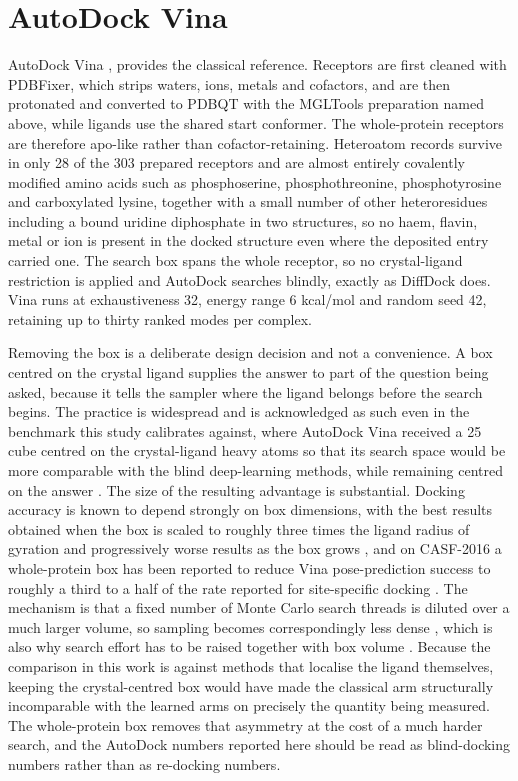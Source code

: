 \hypertarget{autodock-vina-2}{%
\section{AutoDock Vina}\label{autodock-vina-2}}

AutoDock Vina \cite{ref022}, \cite{ref023} provides the classical reference. Receptors are first cleaned with PDBFixer, which strips waters, ions, metals and cofactors, and are then protonated and converted to PDBQT with the MGLTools preparation named above, while ligands use the shared start conformer. The whole-protein receptors are therefore apo-like rather than cofactor-retaining. Heteroatom records survive in only 28 of the 303 prepared receptors and are almost entirely covalently modified amino acids such as phosphoserine, phosphothreonine, phosphotyrosine and carboxylated lysine, together with a small number of other heteroresidues including a bound uridine diphosphate in two structures, so no haem, flavin, metal or ion is present in the docked structure even where the deposited entry carried one. The search box spans the whole receptor, so no crystal-ligand restriction is applied and AutoDock searches blindly, exactly as DiffDock does. Vina runs at exhaustiveness 32, energy range 6 kcal/mol and random seed 42, retaining up to thirty ranked modes per complex.

Removing the box is a deliberate design decision and not a convenience. A box centred on the crystal ligand supplies the answer to part of the question being asked, because it tells the sampler where the ligand belongs before the search begins. The practice is widespread and is acknowledged as such even in the benchmark this study calibrates against, where AutoDock Vina received a 25 \angstrom{} cube centred on the crystal-ligand heavy atoms so that its search space would be more comparable with the blind deep-learning methods, while remaining centred on the answer \cite{ref035}. The size of the resulting advantage is substantial. Docking accuracy is known to depend strongly on box dimensions, with the best results obtained when the box is scaled to roughly three times the ligand radius of gyration and progressively worse results as the box grows \cite{ref079}, and on CASF-2016 a whole-protein box has been reported to reduce Vina pose-prediction success to roughly a third to a half of the rate reported for site-specific docking \cite{ref082}. The mechanism is that a fixed number of Monte Carlo search threads is diluted over a much larger volume, so sampling becomes correspondingly less dense \cite{ref080}, which is also why search effort has to be raised together with box volume \cite{ref081}. Because the comparison in this work is against methods that localise the ligand themselves, keeping the crystal-centred box would have made the classical arm structurally incomparable with the learned arms on precisely the quantity being measured. The whole-protein box removes that asymmetry at the cost of a much harder search, and the AutoDock numbers reported here should be read as blind-docking numbers rather than as re-docking numbers.

